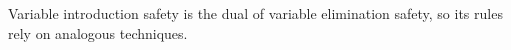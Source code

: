 \documentclass[acmsmall]{acmart}
\theoremstyle{definition}
\begin{document}
Variable introduction safety is the dual of variable elimination safety, so its rules
rely on analogous techniques.

















\end{document}
